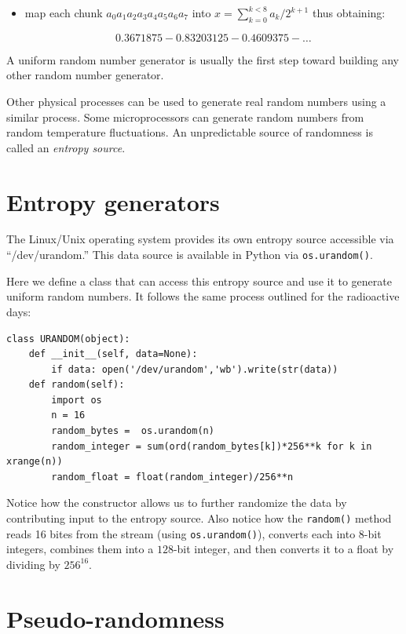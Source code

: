 \documentclass[justified,sixbynine]{tufte-book}
\def\ft{\small\tt}
\theoremstyle{plain}%
\theoremstyle{definition}
\theoremstyle{remark}
\begin{document}
\begin{fullwidth}
\begin{itemize}
\item  map each chunk $a_0a_1a_2a_3a_4a_5a_6a_7$ into $x=\sum_{k=0}^{k<8}a_k/2^{k+1}$
thus obtaining:

\begin{equation}
0.3671875 - 0.83203125 - 0.4609375 -\dots 
\end{equation}
\end{itemize}

A uniform random number generator is usually the first step toward building
any other random number generator.


Other physical processes can be used to generate real random numbers using a similar process.
Some microprocessors can generate random numbers from random temperature fluctuations.
An unpredictable source of randomness is called an {\it entropy source}.

\goodbreak\section{Entropy generators}

The Linux/Unix operating system provides its own entropy source accessible via ``/dev/urandom.'' This data source is available in Python via {\ft os.urandom()}.

Here we define a class that can access this entropy source and use it to generate uniform random numbers. It follows the same process outlined for the radioactive days:


\begin{lstlisting}
class URANDOM(object):
    def __init__(self, data=None):
        if data: open('/dev/urandom','wb').write(str(data))
    def random(self):
        import os
        n = 16
        random_bytes =  os.urandom(n)
        random_integer = sum(ord(random_bytes[k])*256**k for k in xrange(n))
        random_float = float(random_integer)/256**n
\end{lstlisting}

Notice how the constructor allows us to further randomize the data by contributing input to the entropy source. Also notice how the {\ft random()} method reads 16 bites from the stream (using {\ft os.urandom()}), converts each into $8$-bit integers, combines them into a $128$-bit integer, and then converts it to a float by dividing by $256^{16}$.

\goodbreak\section{Pseudo-randomness}


\end{fullwidth}
\end{document}
